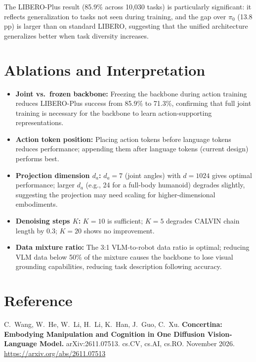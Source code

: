 \documentclass[10pt,twocolumn]{article}
\begin{document}
The LIBERO-Plus result (85.9\% across 10,030 tasks) is particularly significant: it reflects generalization to tasks not seen during training, and the gap over $\pi_0$ (13.8 pp) is larger than on standard LIBERO, suggesting that the unified architecture generalizes better when task diversity increases.

\section{Ablations and Interpretation}

\begin{itemize}[leftmargin=1em,itemsep=2pt]
  \item \textbf{Joint vs.\ frozen backbone:} Freezing the backbone during action training reduces LIBERO-Plus success from 85.9\% to 71.3\%, confirming that full joint training is necessary for the backbone to learn action-supporting representations.
  \item \textbf{Action token position:} Placing action tokens before language tokens reduces performance; appending them after language tokens (current design) performs best.
  \item \textbf{Projection dimension $d_a$:} $d_a = 7$ (joint angles) with $d = 1024$ gives optimal performance; larger $d_a$ (e.g., 24 for a full-body humanoid) degrades slightly, suggesting the projection may need scaling for higher-dimensional embodiments.
  \item \textbf{Denoising steps $K$:} $K=10$ is sufficient; $K=5$ degrades CALVIN chain length by 0.3; $K=20$ shows no improvement.
  \item \textbf{Data mixture ratio:} The 3:1 VLM-to-robot data ratio is optimal; reducing VLM data below 50\% of the mixture causes the backbone to lose visual grounding capabilities, reducing task description following accuracy.
\end{itemize}

\section*{Reference}
C.\ Wang, W.\ He, W.\ Li, H.\ Li, K.\ Han, J.\ Guo, C.\ Xu.
\textbf{Concertina: Embodying Manipulation and Cognition in One Diffusion Vision-Language Model.}
arXiv:2611.07513. cs.CV, cs.AI, cs.RO. November 2026.
\url{https://arxiv.org/abs/2611.07513}
\end{document}
